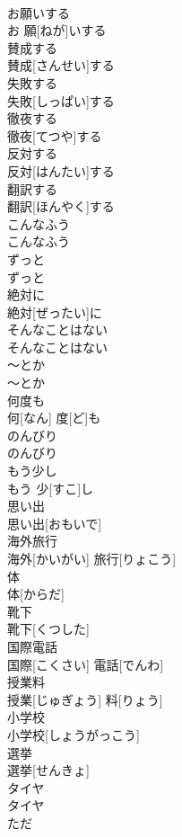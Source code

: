 \documentclass[8pt]{extreport}
\begin{document}
\begin{CJK}{UTF8}{min}
\\	お願いする	
\\	お 願[ねが]いする
\\	賛成する	
\\	賛成[さんせい]する
\\	失敗する	
\\	失敗[しっぱい]する
\\	徹夜する	
\\	徹夜[てつや]する
\\	反対する	
\\	反対[はんたい]する
\\	翻訳する	
\\	翻訳[ほんやく]する
\\	こんなふう	
\\	こんなふう
\\	ずっと	
\\	ずっと
\\	絶対に	
\\	絶対[ぜったい]に
\\	そんなことはない	
\\	そんなことはない
\\	〜とか	
\\	〜とか
\\	何度も	
\\	何[なん] 度[ど]も
\\	のんびり	
\\	のんびり
\\	もう少し	
\\	もう 少[すこ]し
\\	思い出	
\\	思い出[おもいで]
\\	海外旅行	
\\	海外[かいがい] 旅行[りょこう]
\\	体	
\\	体[からだ]
\\	靴下	
\\	靴下[くつした]
\\	国際電話	
\\	国際[こくさい] 電話[でんわ]
\\	授業料	
\\	授業[じゅぎょう] 料[りょう]
\\	小学校	
\\	小学校[しょうがっこう]
\\	選挙	
\\	選挙[せんきょ]
\\	タイヤ	
\\	タイヤ
\\	ただ	

\end{CJK}
\end{document}
